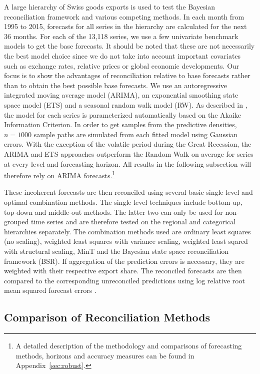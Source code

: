 \documentclass[a4paper,fleqn,11pt]{article}
\begin{document}
A large hierarchy of Swiss goods exports is used to test the Bayesian reconciliation framework and various competing methods. In each month from 1995 to 2015, forecasts for all series in the hierarchy are calculated for the next 36 months. For each of the 13,118 series, we use a few univariate benchmark models to get the base forecasts. It should be noted that these are not necessarily the best model choice since we do not take into account important covariates such as exchange rates, relative prices or global economic developments. Our focus is to show the advantages of reconciliation relative to base forecasts rather than to obtain the best possible base forecasts. We use an autoregressive integrated moving average model (ARIMA), an exponential smoothing state space model (ETS) and a seasonal random walk model (RW). As described in \cite{Hyndman2008}, the model for each series is parameterized automatically based on the Akaike Information Criterion. In order to get samples from the predictive densities, $n = 1000$ sample paths are simulated from each fitted model using Gaussian errors. With the exception of the volatile period during the Great Recession, the ARIMA and ETS approaches outperform the Random Walk on average for series at every level and forecasting horizon. All results in the following subsection will therefore rely on ARIMA forecasts.\footnote{A detailed description of the methodology and comparisons of forecasting methods, horizons and accuracy measures can be found in Appendix~\ref{sec:robust}.}

These incoherent forecasts are then reconciled using several basic single level and optimal combination methods. The single level techniques include bottom-up, top-down and middle-out methods. The latter two can only be used for non-grouped time series and are therefore tested on the regional and categorical hierarchies separately. The combination methods used are ordinary least squares (no scaling), weighted least squares with variance scaling, weighted least sqared with structural scaling, MinT and the Bayesian state space reconciliation framework (BSR). If aggregation of the prediction errors is necessary, they are weighted with their respective export share. The reconciled forecasts are then compared to the corresponding unreconciled predictions using log relative root mean squared forecast errors \citep{Hyndman2006}.


\subsection{Comparison of Reconciliation Methods}
\end{document}
